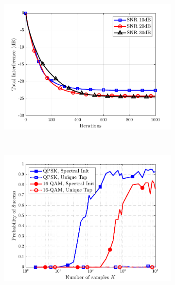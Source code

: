 \begin{figure}
\begin{subfigure}[t]{0.32\textwidth}
\label{wfcma:fig:wf_ssr_4qam_M8L4}
\end{subfigure}\hfill
\begin{subfigure}[t]{0.32\textwidth}
\includegraphics[width=\linewidth]{./figs/wfcma_figs/BF_WF_TI_16QAM_L=4_M=8_K=400_2.pdf}	
\label{wfcma:fig:wf_ssr_16qam_M8L4}
\end{subfigure}\hfill
\\
\begin{subfigure}[t]{0.32\textwidth}
\includegraphics[width=\linewidth]{./figs/wfcma_figs/BF_WF_sucess_allmods_L=9_M=16_T=1000_mu=1e-4.pdf}	

\end{subfigure}
\end{figure}
